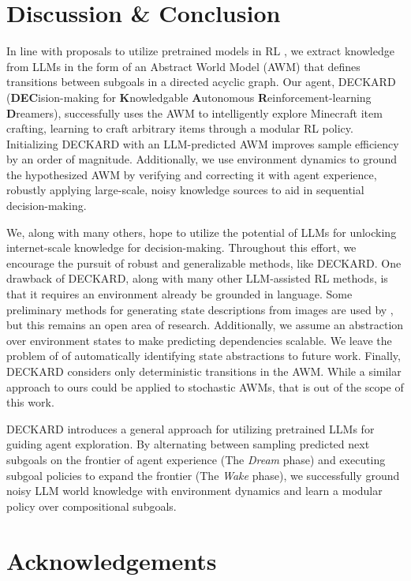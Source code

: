 \documentclass[nohyperref]{article}
\theoremstyle{plain}
\theoremstyle{definition}
\theoremstyle{remark}
\newcommand{\agentshort}{\textsc{DECKARD}}
\newcommand{\agentlong}{\textbf{DEC}ision-making for \textbf{K}nowledgable \textbf{A}utonomous \textbf{R}einforcement-learning \textbf{D}reamers}
\begin{document}
\section{Discussion \& Conclusion}

In line with proposals to utilize pretrained models in RL \cite{agarwal2022reincarnating}, we extract knowledge from LLMs in the form of an Abstract World Model (AWM) that defines transitions between subgoals in a directed acyclic graph.
Our agent, \agentshort{} (\agentlong{}), successfully uses the AWM to intelligently explore Minecraft item crafting, learning to craft arbitrary items through a modular RL policy.
Initializing \agentshort{} with an LLM-predicted AWM improves sample efficiency by an order of magnitude.
Additionally, we use environment dynamics to ground the hypothesized AWM by verifying and correcting it with agent experience, robustly applying large-scale, noisy knowledge sources to aid in sequential decision-making.

We, along with many others, hope to utilize the potential of LLMs for unlocking internet-scale knowledge for decision-making.
Throughout this effort, we encourage the pursuit of robust and generalizable methods, like \agentshort{}.
One drawback of \agentshort{}, along with many other LLM-assisted RL methods, is that it requires an environment already be grounded in language.
Some preliminary methods for generating state descriptions from images are used by \citet{tam2022semantic}, but this remains an open area of research.
Additionally, we assume an abstraction over environment states to make predicting dependencies scalable.
We leave the problem of of automatically identifying state abstractions to future work.
Finally, \agentshort{} considers only deterministic transitions in the AWM.
While a similar approach to ours could be applied to stochastic AWMs, that is out of the scope of this work. 

\agentshort{} introduces a general approach for utilizing pretrained LLMs for guiding agent exploration.
By alternating between sampling predicted next subgoals on the frontier of agent experience (The \textit{Dream} phase) and executing subgoal policies to expand the frontier (The \textit{Wake} phase), we successfully ground noisy LLM world knowledge with environment dynamics and learn a modular policy over compositional subgoals.

\section*{Acknowledgements}
\end{document}
